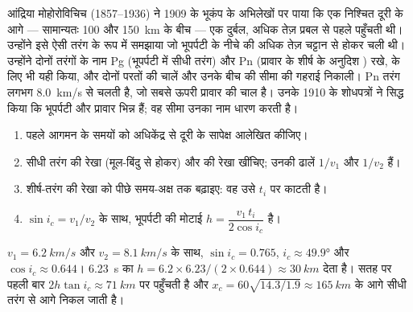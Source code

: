 \begin{history}[मोहोरोविचिच और दो P तरंगें, 1909]
आंद्रिया मोहोरोविचिच (1857--1936) ने 1909 के भूकंप के अभिलेखों पर पाया
कि एक निश्चित दूरी के आगे --- सामान्यतः 100 और
\qty{150}{km} के बीच --- एक दुर्बल, अधिक तेज़  प्रबल  से पहले पहुँचती थी।
उन्होंने इसे ऐसी तरंग के रूप में समझाया जो भूपर्पटी के नीचे की अधिक तेज़ चट्टान से होकर
चली थी। उन्होंने दोनों तरंगों के नाम Pg (भूपर्पटी में सीधी तरंग) और Pn (प्रावार के
शीर्ष के अनुदिश ) रखे,  के लिए भी यही किया, और
दोनों परतों की चालें और उनके बीच की सीमा की गहराई निकाली।
Pn तरंग लगभग \qty{8.0}{km/s} से चलती है, जो सबसे ऊपरी
प्रावार की चाल है। उनके 1910 के शोधपत्रों ने सिद्ध किया कि भूपर्पटी और प्रावार
भिन्न हैं; वह सीमा उनका नाम धारण करती है।
\end{history}

\begin{method}[यात्रा-काल आरेख से मोहो की गहराई]\label{met:g11:seismic-structure:moho}
\begin{enumerate}
  \item पहले आगमन के समयों को अधिकेंद्र से दूरी के सापेक्ष
        आलेखित कीजिए।
  \item सीधी तरंग की रेखा (मूल-बिंदु से होकर) और  की
        रेखा खींचिए; उनकी ढालें $1/v_1$ और $1/v_2$ हैं।
  \item शीर्ष-तरंग की रेखा को पीछे समय-अक्ष तक बढ़ाइए: वह उसे
         $t_i$ पर काटती है।
  \item $\sin i_c = v_1/v_2$ के साथ, भूपर्पटी की मोटाई
        $h = \dfrac{v_1\,t_i}{2\cos i_c}$ है।
\end{enumerate}
\end{method}

\begin{example}[\qty{30}{km} मोटी भूपर्पटी]\label{ex:g11:seismic-structure:moho}
$v_1 = \qty{6.2}{km/s}$ और $v_2 = \qty{8.1}{km/s}$ के साथ, $\sin i_c = 0.765$,
$i_c \approx \ang{49.9}$ और $\cos i_c \approx 0.644$। \qty{6.23}{s} का
 $h = 6.2 \times 6.23/(2 \times 0.644) \approx
\qty{30}{km}$ देता है।  सतह पर पहली बार
$2h\tan i_c \approx \qty{71}{km}$ पर पहुँचती है और
$x_c = 60\sqrt{14.3/1.9} \approx \qty{165}{km}$ के आगे सीधी तरंग से आगे निकल जाती है।
\end{example}

